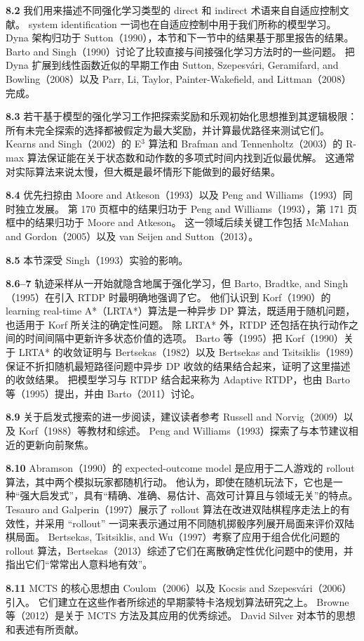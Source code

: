 \documentclass[UTF8,12pt,a4paper,fontset=fandol]{ctexart}
\begin{document}
\noindent\textbf{8.2}
我们用来描述不同强化学习类型的 direct 和 indirect 术语来自自适应控制文献。
system identification 一词也在自适应控制中用于我们所称的模型学习。
Dyna 架构归功于 Sutton（1990），本节和下一节中的结果基于那里报告的结果。
Barto and Singh（1990）讨论了比较直接与间接强化学习方法时的一些问题。
把 Dyna 扩展到线性函数近似的早期工作由 Sutton, Szepesvári, Geramifard, and Bowling（2008）以及 Parr, Li, Taylor, Painter-Wakefield, and Littman（2008）完成。

\noindent\textbf{8.3}
若干基于模型的强化学习工作把探索奖励和乐观初始化思想推到其逻辑极限：所有未完全探索的选择都被假定为最大奖励，并计算最优路径来测试它们。
Kearns and Singh（2002）的 E$^3$ 算法和 Brafman and Tennenholtz（2003）的 R-max 算法保证能在关于状态数和动作数的多项式时间内找到近似最优解。
这通常对实际算法来说太慢，但大概是最坏情形下能做到的最好结果。

\noindent\textbf{8.4}
优先扫掠由 Moore and Atkeson（1993）以及 Peng and Williams（1993）同时独立发展。
第 170 页框中的结果归功于 Peng and Williams（1993），第 171 页框中的结果归功于 Moore and Atkeson。
这一领域后续关键工作包括 McMahan and Gordon（2005）以及 van Seijen and Sutton（2013）。

\noindent\textbf{8.5}
本节深受 Singh（1993）实验的影响。

\noindent\textbf{8.6--7}
轨迹采样从一开始就隐含地属于强化学习，但 Barto, Bradtke, and Singh（1995）在引入 RTDP 时最明确地强调了它。
他们认识到 Korf（1990）的 learning real-time A*（LRTA*）算法是一种异步 DP 算法，既适用于随机问题，也适用于 Korf 所关注的确定性问题。
除 LRTA* 外，RTDP 还包括在执行动作之间的时间间隔中更新许多状态价值的选项。
Barto 等（1995）把 Korf（1990）关于 LRTA* 的收敛证明与 Bertsekas（1982）以及 Bertsekas and Tsitsiklis（1989）保证不折扣随机最短路径问题中异步 DP 收敛的结果结合起来，证明了这里描述的收敛结果。
把模型学习与 RTDP 结合起来称为 Adaptive RTDP，也由 Barto 等（1995）提出，并由 Barto（2011）讨论。

\noindent\textbf{8.9}
关于启发式搜索的进一步阅读，建议读者参考 Russell and Norvig（2009）以及 Korf（1988）等教材和综述。
Peng and Williams（1993）探索了与本节建议相近的更新向前聚焦。

\noindent\textbf{8.10}
Abramson（1990）的 expected-outcome model 是应用于二人游戏的 rollout 算法，其中两个模拟玩家都随机行动。
他认为，即使在随机玩法下，它也是一种“强大启发式”，具有“精确、准确、易估计、高效可计算且与领域无关”的特点。
Tesauro and Galperin（1997）展示了 rollout 算法在改进双陆棋程序走法上的有效性，并采用 “rollout” 一词来表示通过用不同随机掷骰序列展开局面来评价双陆棋局面。
Bertsekas, Tsitsiklis, and Wu（1997）考察了应用于组合优化问题的 rollout 算法，Bertsekas（2013）综述了它们在离散确定性优化问题中的使用，并指出它们“常常出人意料地有效”。

\noindent\textbf{8.11}
MCTS 的核心思想由 Coulom（2006）以及 Kocsis and Szepesvári（2006）引入。
它们建立在这些作者所综述的早期蒙特卡洛规划算法研究之上。
Browne 等（2012）是关于 MCTS 方法及其应用的优秀综述。
David Silver 对本节的思想和表述有所贡献。
\end{document}
